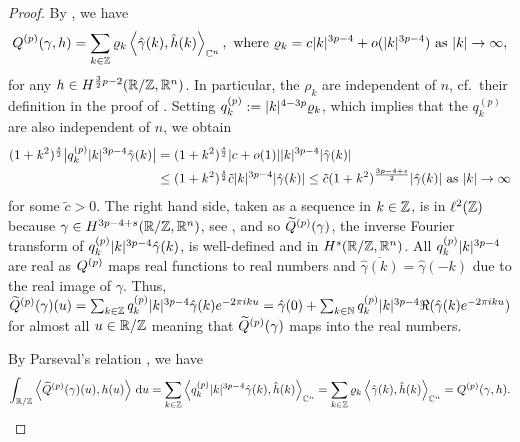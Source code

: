 \begin{proof}
    By \cite[Proposition 4.1]{BlattReiter:2015:Menger}, we have
    \[
        \Qp(\gamma,h) = \sum_{k \in \Z}\rho_k \left< \hat \gamma(k),\hat h(k)\right>_{\C^n}, \text{ where } \rho_k = c\abs{k}^{3p-4} + o(\abs{k}^{3p-4}) \text{ as } \abs{k} \to \infty,
    \]
    for any $h \in H^{\frac 3 2 p -2}(\R/\Z,\R^n)$. In particular,  the $\rho_k$ are independent of $n$, cf.\ their definition in the proof of \cite[Proposition 4.1]{BlattReiter:2015:Menger}.
    Setting $q_k^{(p)} := \abs{k}^{4-3p} \rho_k$, which implies that the $q_k^{(p)}$ are also independent of $n$, we obtain
    \[
        \begin{split}
            (1+k^2)^{\frac s 2}\abs[\big]{q_k^{(p)}\abs{k}^{3p-4}\hat \gamma(k)}
            &= (1+k^2)^{\frac s 2}\abs{c+o(1)}\abs{k}^{3p-4} \abs{\hat \gamma(k)}\\
            &\le (1+k^2)^{\frac s 2} \tilde c \abs{k}^{3p-4} \abs{\hat \gamma(k)}
            \le \tilde c (1+k^2)^{\frac {3p-4+s} {2}} \abs{\hat \gamma(k)} \text{ as } \abs{k} \to \infty
        \end{split}
    \]
    for some $\tilde c>0$.
    The right hand side, taken as a sequence in $k \in \Z$, is in $\ell^2(\Z)$ because $\gamma \in H^{3p-4+s}(\R/\Z,\R^n)$, see \cite[Chapter~4, (3.8)]{Taylor:1996:PartialDifferentialEquationsa},
    and so $\Qpt(\gamma)$, the inverse Fourier transform of $q_k^{(p)}\abs{k}^{3p-4}\hat \gamma(k)$, is well-defined and in $H^s(\R/\Z,\R^n)$.
    All $q_k^{(p)}\abs{k}^{3p-4}$ are real as $\Qp$ maps real functions to real numbers and $\overline{\hat \gamma(k)} = \hat \gamma (-k)$ due to the real image of $\gamma$.
    Thus, $\Qpt(\gamma)(u) = \sum_{k\in \Z} q_k^{(p)}\abs{k}^{3p-4} \hat{\gamma}(k) e^{-2\pi i k u} = \hat \gamma(0) + \sum_{k \in \N} q_k^{(p)}\abs{k}^{3p-4} \Re(\hat \gamma(k) e^{-2 \pi i k u})$ for almost all $u \in \R/\Z$ meaning that $\Qpt(\gamma)$ maps into the real numbers.
    
    By Parseval's relation \cite[Proposition~3.2.7~(3)]{Grafakos:2014:ClassicalFourierAnalysis}, we have
    \[
        \int_{\R/\Z} \left<\Qpt(\gamma)(u),h(u)\right> \d u
        = \sum_{k\in \Z} \left< q_k^{(p)}\abs{k}^{3p-4}\hat \gamma(k), \hat h(k)\right>_{\C^n}
        = \sum_{k \in \Z}\rho_k \left< \hat \gamma(k),\hat h(k)\right>_{\C^n}
        = \Qp(\gamma,h).
    \]
\end{proof}

